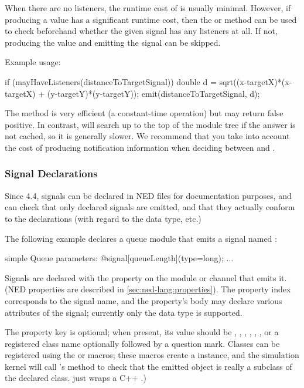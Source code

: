 When there are no listeners, the runtime cost of  is usually minimal.
However, if producing a value has a significant runtime cost, then the
 or  method can be used
to check beforehand whether the given signal has any listeners at all.
If not, producing the value and emitting the signal can be skipped.

Example usage:

\begin{cpp}
if (mayHaveListeners(distanceToTargetSignal)) {
    double d = sqrt((x-targetX)*(x-targetX) + (y-targetY)*(y-targetY));
    emit(distanceToTargetSignal, d);
}
\end{cpp}

The  method is very efficient (a constant-time
operation) but may return false positive. In contrast,
 will search up to the top of the module tree if
the answer is not cached, so it is generally slower. We recommend that
you take into account the cost of producing notification information when
deciding between  and .


\subsubsection{Signal Declarations}
\label{sec:simple-modules:signal-declarations}

Since {\opp} 4.4, signals can be declared in NED files for documentation
purposes, and {\opp} can check that only declared signals are emitted,
and that they actually conform to the declarations (with regard to the
data type, etc.)

The following example declares a queue module that emits a signal named
:

\begin{ned}
simple Queue
{
    parameters:
        @signal[queueLength](type=long);
        ...
}
\end{ned}

Signals are declared with the  property on
the module or channel that emits it. (NED properties are described in
\ref{sec:ned-lang:properties}). The property index corresponds
to the signal name, and the property's body may declare various attributes
of the signal; currently only the data type is supported.

The  property key is optional; when present, its value should be
, , , , ,
, or a registered class name optionally followed by a question
mark. Classes can be registered using the  or
 macros; these macros create a
 instance, and the simulation kernel will call
's  method to check that the
emitted object is really a subclass of the declared class.
 just wraps a C++ .)

